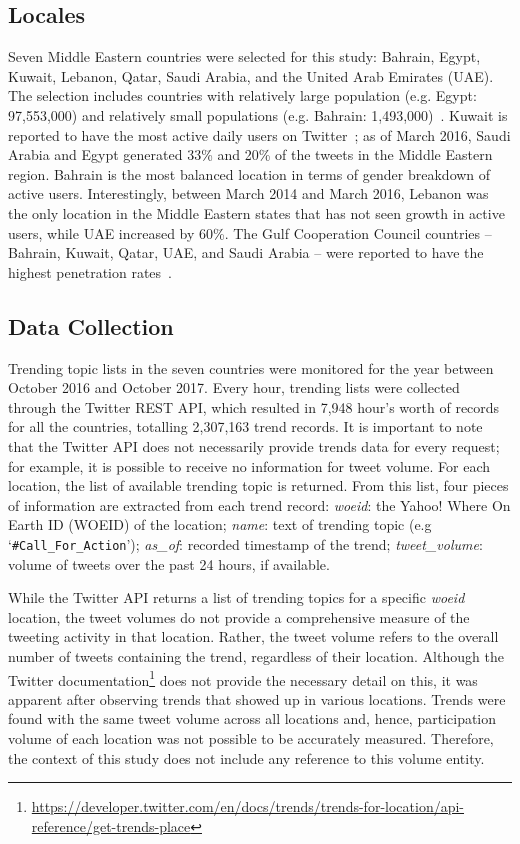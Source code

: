 \documentclass{llncs}
\begin{document}
\subsection{Locales}

Seven Middle Eastern countries were selected for this study: Bahrain,
Egypt, Kuwait, Lebanon, Qatar, Saudi Arabia, and the United Arab
Emirates (UAE). The selection includes countries with relatively large
population (e.g. Egypt: 97,553,000) and relatively small populations
(e.g. Bahrain:
1,493,000)~\cite{UnitedNationsDepartmentofEconomicandSocialAffairs2017}.
Kuwait is reported to have the most active daily users on
Twitter~\cite{Salem2017}; as of March 2016, Saudi Arabia and Egypt
generated 33\% and 20\% of the tweets in the Middle Eastern
region. Bahrain is the most balanced location in terms of gender
breakdown of active users. Interestingly, between March 2014 and March
2016, Lebanon was the only location in the Middle Eastern states that
has not seen growth in active users, while UAE increased by 60\%. The
Gulf Cooperation Council countries -- Bahrain, Kuwait, Qatar, UAE, and
Saudi Arabia -- were reported to have the highest penetration
rates~\cite{Salem2017}.

\subsection{Data Collection}

Trending topic lists in the seven countries were monitored for the year
between October 2016 and October 2017. Every hour, trending lists were
collected through the Twitter REST API, which resulted in 7,948 hour's
worth of records for all the countries, totalling 2,307,163 trend
records. It is important to note that the Twitter API does not
necessarily provide trends data for every request; for example, it is
possible to receive no information for tweet volume. For each
location, the list of available trending topic is returned. From this
list, four pieces of information are extracted from each trend record:
{\emph{woeid}}: the Yahoo! Where On Earth ID (WOEID) of the location;
{\emph{name}}: text of trending topic (e.g
`{\texttt{\#Call\_For\_Action}}'); {\emph{as\_of}}: recorded timestamp
of the trend; {\emph{tweet\_volume}}: volume of tweets over the past
24 hours, if available.

While the Twitter API returns a list of trending topics for a specific
{\emph{woeid}} location, the tweet volumes do not provide a
comprehensive measure of the tweeting activity in that
location. Rather, the tweet volume refers to the overall number of
tweets containing the trend, regardless of their location. Although
the Twitter
documentation\footnote{\url{https://developer.twitter.com/en/docs/trends/trends-for-location/api-reference/get-trends-place}}
does not provide the necessary detail on this, it was apparent after
observing trends that showed up in various locations. Trends were
found with the same tweet volume across all locations and, hence,
participation volume of each location was not possible to be
accurately measured. Therefore, the context of this study does not
include any reference to this volume entity.
\end{document}
